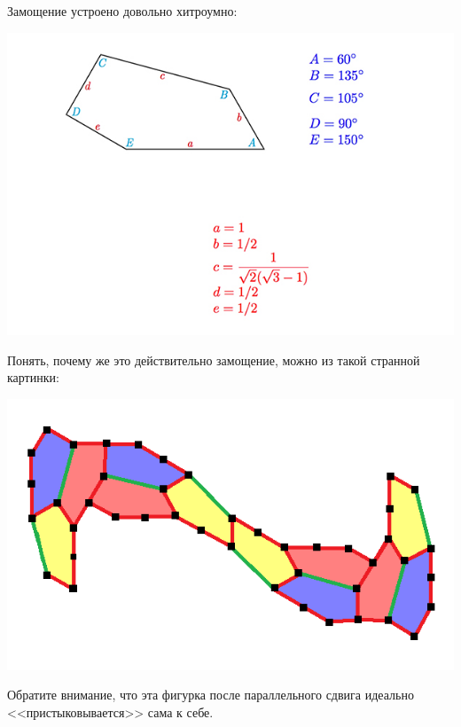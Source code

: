 \documentclass{beamer}
\begin{document}
\begin{frame}
Замощение устроено довольно хитроумно:

\begin{center}
\includegraphics[width=\textwidth]{5-new-size.jpg}
\end{center}

\end{frame}


\begin{frame}
Понять, почему же это действительно замощение, можно из такой странной картинки:

\vspace{-2ex}

\begin{center}
\includegraphics[width=\textwidth]{lattice.png}
\end{center}

\vspace{-6ex}

\pause

Обратите внимание, что эта фигурка после параллельного сдвига идеально <<пристыковывается>> сама к себе.

\end{frame}
\end{document}
